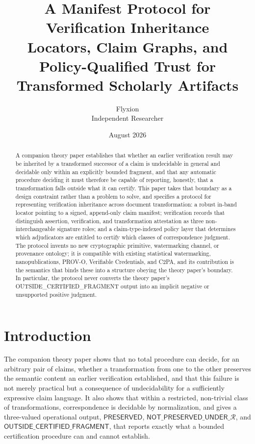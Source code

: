 \documentclass[11pt]{article}
\title{A Manifest Protocol for Verification Inheritance \\
\large Locators, Claim Graphs, and Policy-Qualified Trust for Transformed Scholarly Artifacts}
\author{Flyxion \\ \small Independent Researcher}
\date{August 2026}
\begin{document}
\maketitle

\begin{abstract}
A companion theory paper establishes that whether an earlier verification result may be inherited by a transformed successor of a claim is undecidable in general and decidable only within an explicitly bounded fragment, and that any automatic procedure deciding it must therefore be capable of reporting, honestly, that a transformation falls outside what it can certify. This paper takes that boundary as a design constraint rather than a problem to solve, and specifies a protocol for representing verification inheritance across document transformation: a robust in-band locator pointing to a signed, append-only claim manifest; verification records that distinguish assertion, verification, and transformation attestation as three non-interchangeable signature roles; and a claim-type-indexed policy layer that determines which adjudicators are entitled to certify which classes of correspondence judgment. The protocol invents no new cryptographic primitive, watermarking channel, or provenance ontology; it is compatible with existing statistical watermarking, nanopublications, PROV-O, Verifiable Credentials, and C2PA, and its contribution is the semantics that binds these into a structure obeying the theory paper's boundary. In particular, the protocol never converts the theory paper's \textsf{OUTSIDE\_CERTIFIED\_FRAGMENT} output into an implicit negative or unsupported positive judgment.
\end{abstract}

\section{Introduction}

The companion theory paper shows that no total procedure can decide, for an arbitrary pair of claims, whether a transformation from one to the other preserves the semantic content an earlier verification established, and that this failure is not merely practical but a consequence of undecidability for a sufficiently expressive claim language. It also shows that within a restricted, non-trivial class of transformations, correspondence is decidable by normalization, and gives a three-valued operational output, $\textsf{PRESERVED}$, $\textsf{NOT\_PRESERVED\_UNDER\_}\mathcal{R}$, and $\textsf{OUTSIDE\_CERTIFIED\_FRAGMENT}$, that reports exactly what a bounded certification procedure can and cannot establish.
\end{document}
